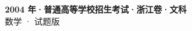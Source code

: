 \documentclass[zihao=-4, a4paper]{ctexart}
\begin{document}
\begin{center}
  {\Large\bfseries 2004 年·普通高等学校招生考试·浙江卷·文科}\\[4pt]
  {\large 数学 · 试题版}
\end{center}
\medskip
{}

\end{document}
